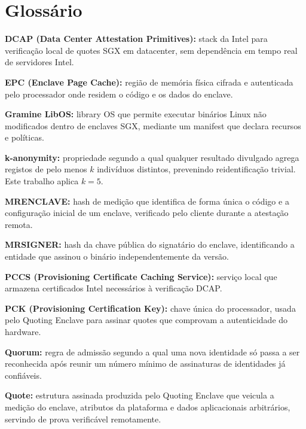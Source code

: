 
\section*{Glossário}

\noindent\textbf{DCAP (Data Center Attestation Primitives):} stack da Intel para verificação local de quotes SGX em datacenter, sem dependência em tempo real de servidores Intel.

\noindent\textbf{EPC (Enclave Page Cache):} região de memória física cifrada e autenticada pelo processador onde residem o código e os dados do enclave.

\noindent\textbf{Gramine LibOS:} library OS que permite executar binários Linux não modificados dentro de enclaves SGX, mediante um manifest que declara recursos e políticas.

\noindent\textbf{k-anonymity:} propriedade segundo a qual qualquer resultado divulgado agrega registos de pelo menos $k$ indivíduos distintos, prevenindo reidentificação trivial. Este trabalho aplica $k=5$.

\noindent\textbf{MRENCLAVE:} hash de medição que identifica de forma única o código e a configuração inicial de um enclave, verificado pelo cliente durante a atestação remota.

\noindent\textbf{MRSIGNER:} hash da chave pública do signatário do enclave, identificando a entidade que assinou o binário independentemente da versão.

\noindent\textbf{PCCS (Provisioning Certificate Caching Service):} serviço local que armazena certificados Intel necessários à verificação DCAP.

\noindent\textbf{PCK (Provisioning Certification Key):} chave única do processador, usada pelo Quoting Enclave para assinar quotes que comprovam a autenticidade do hardware.

\noindent\textbf{Quorum:} regra de admissão segundo a qual uma nova identidade só passa a ser reconhecida após reunir um número mínimo de assinaturas de identidades já confiáveis.

\noindent\textbf{Quote:} estrutura assinada produzida pelo Quoting Enclave que veicula a medição do enclave, atributos da plataforma e dados aplicacionais arbitrários, servindo de prova verificável remotamente.

